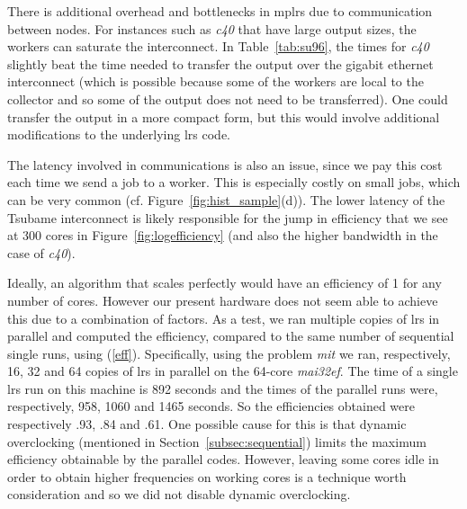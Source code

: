 \documentclass[a4paper,11pt]{article}   \usepackage{authblk} \usepackage[top=1.9cm,bottom=1.9cm,left=1.9cm,right=1.9cm]{geometry}
\newcommand{\progname}{\textsf}
\newcommand{\compname}{\emph}
\newcommand{\lrs}{\progname{lrs}\xspace}
\newcommand{\mplrs}{\progname{mplrs}\xspace}
\newcommand{\maief}{\compname{mai32ef}\xspace}
\newcommand{\polytope}{\emph}
\newcommand{\cforty}{\polytope{c40}\xspace}
\newcommand{\mitine}{\polytope{mit}\xspace}
\begin{document}
There is additional overhead and bottlenecks in \mplrs due to 
communication between nodes.  For instances such as \cforty that have large
output sizes, the workers can saturate the interconnect.  In 
Table~\ref{tab:su96}, the times for \cforty slightly beat the time needed
to transfer the output over the gigabit ethernet interconnect (which is
possible because some of the workers are local to the collector and so
some of the output does not need to be transferred).  One could transfer
the output in a more compact form, but this would involve additional
modifications to the underlying \lrs code.

The latency involved in communications is also an issue, since we pay
this cost each time we send a job to a worker.  This is especially costly
on small jobs, which can be very common 
(cf. Figure~\ref{fig:hist_sample}(d)).  The lower latency
of the Tsubame interconnect is likely responsible for the jump in efficiency
that we see at 300 cores in Figure~\ref{fig:logefficiency} (and also
the higher bandwidth in the case of \cforty).

Ideally, an algorithm that scales perfectly would have an efficiency of 1
for any number of cores.
However our present hardware does not seem able to achieve this due to a combination of factors.
As a test, we ran
multiple copies of \lrs in parallel and computed the efficiency,
compared to the same number of sequential single runs, using (\ref{eff}).
Specifically, using the problem \mitine
we ran, respectively, 16, 32 and 64 copies of \lrs in parallel on
the 64-core
\maief.
The time
of a single \lrs run on this machine is 892 seconds
and the times of the parallel runs were, respectively, 958, 1060 and 1465 seconds.
So the efficiencies obtained
were respectively .93, .84 and .61.
One possible cause for this is that dynamic overclocking (mentioned in
Section~\ref{subsec:sequential})
limits the maximum efficiency obtainable by the parallel codes.
However, leaving some cores idle in order to obtain higher frequencies
on working cores is a technique worth consideration and so we did not disable
dynamic overclocking.
\end{document}
